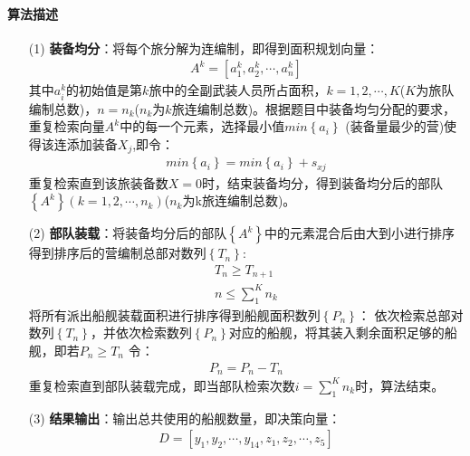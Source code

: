 \documentclass{whutmod}
\begin{document}
	 \paragraph{算法描述}
	 	\begin{itemize}
	 	\item [(1)] \textbf{装备均分}：将每个旅分解为连编制，即得到面积规划向量：
	 \begin{gather*}
	 	A^k=[a^k_{1},a^k_{2},\cdots,a^k_{n}]
	\end{gather*}
	 	其中$a^k_{i}$的初始值是第$k$旅中的全副武装人员所占面积，$k=1,2,\cdots,K$($K$为旅队编制总数)，$n=n_{k}$($n_{k}$为$k$旅连编制总数)。根据题目中装备均匀分配的要求，重复检索向量$A^k$中的每一个元素，选择最小值$min \left \{ a_{i} \right \}$ (装备量最少的营)使得该连添加装备$X_{j}$,即令：
	 	\begin{gather*}
	   min \left \{ a_{i} \right \}=min \left \{ a_{i} \right \}+s_{xj}
	 	\end{gather*}
	 	重复检索直到该旅装备数$X=0$时，结束装备均分，得到装备均分后的部队$ \left \{A^k\right \}(k=1,2,\cdots,n_{k})$($n_{k}$为k旅连编制总数)。
	
		\item [(2)] \textbf{部队装载}：将装备均分后的部队$ \left \{A^k\right \}$中的元素混合后由大到小进行排序得到排序后的营编制总部对数列$ \left \{T_{n}\right \}$:
			\begin{gather*}
	T_{n}\geqslant 	T_{n+1}\\
	n\leq \sum_{1}^{K}n_{k}
		\end{gather*}
		将所有派出船舰装载面积进行排序得到船舰面积数列$ \left \{P_{n}\right \}$：
		依次检索总部对数列$ \left \{T_{n}\right \}$，并依次检索数列$ \left \{P_{n}\right \}$对应的船舰，将其装入剩余面积足够的船舰，即若$P_{n}\geqslant T_{n}$ 令：
		\begin{gather*}
		P_{n}=	P_{n}-	T_{n}
		\end{gather*}
		重复检索直到部队装载完成，即当部队检索次数$i=\sum_{1}^{K}n_{k}$时，算法结束。
		\item [(3)] \textbf{结果输出}：输出总共使用的船舰数量，即决策向量：
		\begin{gather*}
		D=[y_{1},y_{2},\cdots,y_{14},z_{1},z_{2},\cdots,z_{5}]
		\end{gather*}
	\end{itemize}
	 
\end{document}
